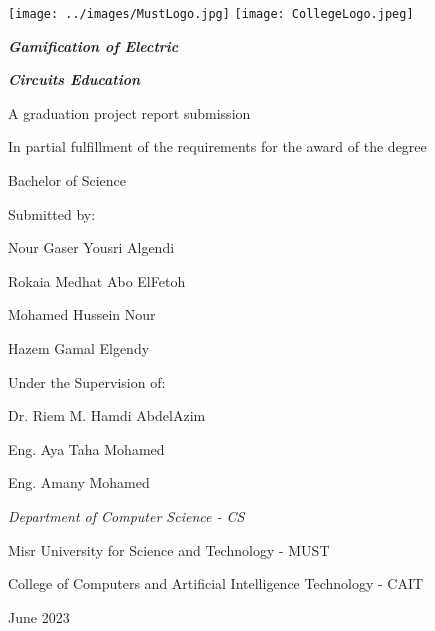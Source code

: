 \documentclass[../main.tex]{subfiles}
\begin{document}
\centering
\texttt{[image: ../images/MustLogo.jpg]}
\hspace{6cm}
\texttt{[image: CollegeLogo.jpeg]}
\vspace{2cm}

\textit{\textbf{\LARGE Gamification of Electric}}

\textit{\textbf{\LARGE Circuits Education}}

\vspace{2cm}
A graduation project report submission

In partial fulfillment of the requirements for the award of the degree

Bachelor of Science

\vspace{2cm}
\large
Submitted by:

\vspace{1cm}
Nour Gaser Yousri Algendi

Rokaia Medhat Abo ElFetoh

Mohamed Hussein Nour

 Hazem Gamal Elgendy
 
\vspace{1.5cm}
Under the Supervision of:

Dr. Riem M. Hamdi AbdelAzim

Eng. Aya Taha Mohamed

Eng. Amany Mohamed


\vspace{2cm}
\normalsize
\textit{Department of Computer Science - CS}

Misr University for Science and Technology - MUST

College of Computers and Artificial Intelligence Technology - CAIT

June 2023
\end{document}
